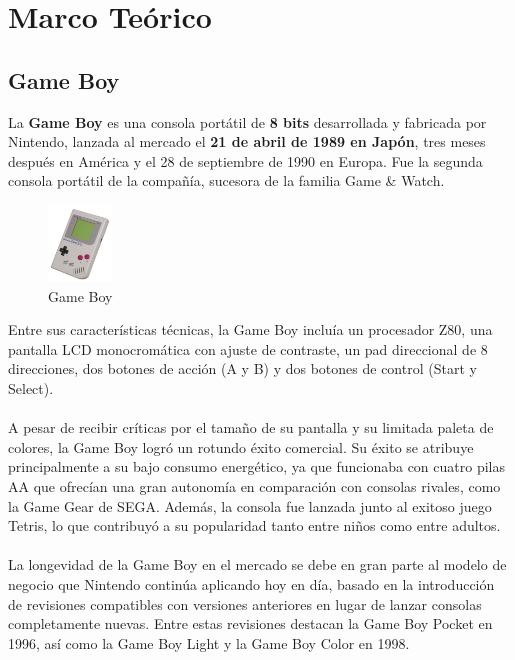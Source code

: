 \chapter{Marco Teórico}
\label{gb}

\section{Game Boy}
La \textbf{Game Boy} es una consola portátil de \textbf{8 bits} desarrollada y fabricada por Nintendo, lanzada al mercado el \textbf{21 de abril de 1989 en Japón}, tres meses después en América y el 28 de septiembre de 1990 en Europa. Fue la segunda consola portátil de la compañía, sucesora de la familia Game \& Watch. \\

\begin{figure}[h]
\centering
\includegraphics[width=0.15\textwidth]{include/images/gb.jpg}
\caption{Game Boy}
\label{figure:gb}
\end{figure}

Entre sus características técnicas, la Game Boy incluía un procesador Z80, una pantalla LCD monocromática con ajuste de contraste, un pad direccional de 8 direcciones, dos botones de acción (A y B) y dos botones de control (Start y Select).
\\\\
A pesar de recibir críticas por el tamaño de su pantalla y su limitada paleta de colores, la Game Boy logró un rotundo éxito comercial. Su éxito se atribuye principalmente a su bajo consumo energético, ya que funcionaba con cuatro pilas AA que ofrecían una gran autonomía en comparación con consolas rivales, como la Game Gear de SEGA. Además, la consola fue lanzada junto al exitoso juego Tetris, lo que contribuyó a su popularidad tanto entre niños como entre adultos.
\\\\
La longevidad de la Game Boy en el mercado se debe en gran parte al modelo de negocio que Nintendo continúa aplicando hoy en día, basado en la introducción de revisiones compatibles con versiones anteriores en lugar de lanzar consolas completamente nuevas. Entre estas revisiones destacan la Game Boy Pocket en 1996, así como la Game Boy Light y la Game Boy Color en 1998.

